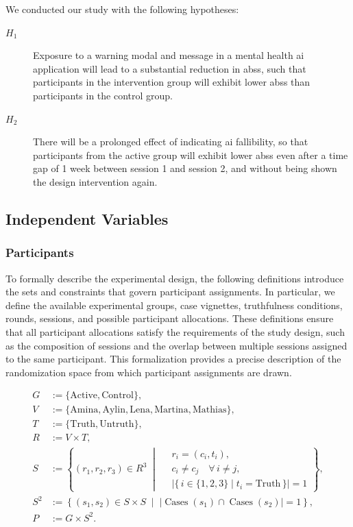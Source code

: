 \documentclass[sigconf,natbib=false]{acmart}
\begin{document}
We conducted our study with the following hypotheses:

\begin{description}
\item[$H_1$] Exposure to a warning modal and message in a mental health \Gls{ai} application will lead to a substantial reduction in \glspl{abs}, such that participants in the intervention group will exhibit lower \glspl{abs} than participants in the control group. 

\item[$H_2$] There will be a prolonged effect of indicating \gls{ai} fallibility, so that participants from the active group will exhibit lower \glspl{abs} even after a time gap of 1 week between session 1 and session 2, and without being shown the design intervention again. 
\end{description}

\subsection{Independent Variables}
\subsubsection{Participants}
\label{sec:participants}

To formally describe the experimental design, the following definitions introduce the sets and constraints that govern participant assignments.
In particular, we define the available experimental groups, case vignettes, truthfulness conditions, rounds, sessions, and possible participant allocations.
These definitions ensure that all participant allocations satisfy the requirements of the study design, such as the composition of sessions and the overlap between multiple sessions assigned to the same participant.
This formalization provides a precise description of the randomization space from which participant assignments are drawn.

\begin{equation}
\begin{aligned}
G &:= \{\mathrm{Active}, \mathrm{Control}\},\\
V &:= \{\mathrm{Amina}, \mathrm{Aylin}, \mathrm{Lena},
        \mathrm{Martina}, \mathrm{Mathias}\},\\
T &:= \{\mathrm{Truth}, \mathrm{Untruth}\},\\
R &:= V \times T,\\[0.5em]
S &:= \left\{
(r_1,r_2,r_3)\in R^3
\;\middle|\;
\begin{aligned}
&r_i=(c_i,t_i),\\
&c_i \neq c_j \quad \forall\, i \neq j,\\
&\bigl|\{\,i\in\{1,2,3\}\mid t_i=\mathrm{Truth}\,\}\bigr|=1
\end{aligned}
\right\},\\[0.5em]
S^2 &:= \left\{
(s_1,s_2)\in S\times S
\;\middle|\;
\bigl|\operatorname{Cases}(s_1)\cap \operatorname{Cases}(s_2)\bigr|=1
\right\},\\
P &:= G \times S^2.
\end{aligned}
\label{eq:Sets}
\end{equation}
\end{document}
